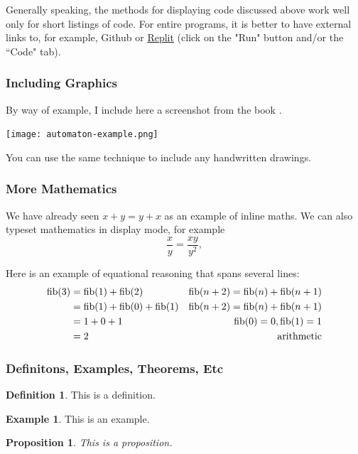 \documentclass{article}
\theoremstyle{theorem}
\newtheorem{proposition}[theorem]{Proposition}
\theoremstyle{definition}
\newtheorem{definition}[theorem]{Definition}
\newtheorem{example}[theorem]{Example}
\theoremstyle{remark}
\begin{document}
\medskip\noindent
Generally speaking,  the methods for displaying code discussed above work well only for short listings of code. For entire programs, it is better to have external links to, for example, Github or \href{https://replit.com/@alexhkurz/automata01#main.hs}{Replit} (click on the "Run" button and/or the ``Code" tab).

\subsubsection{Including Graphics}

By way of example, I include here a screenshot from the book \cite{Hopcroft}.

\texttt{[image: automaton-example.png]}

\noindent
You can use the same technique to include any handwritten drawings.

\subsubsection{More Mathematics}

We have already seen $x+y=y+x$ as an example of inline maths. We can also typeset mathematics in display mode, for example
$$\frac x y =\frac{xy}{y^2},$$

\noindent
Here is an example of equational reasoning that spans several lines:
\begin{align*}
{\rm fib}(3)
& = {\rm fib}(1) +{\rm fib}(2)  & {\rm fib}(n+2) = {\rm fib}(n)  + {\rm fib}(n+1) \\
& = {\rm fib}(1) +{\rm fib}(0)  + {\rm fib}(1) & {\rm fib}(n+2) = {\rm fib}(n)  + {\rm fib}(n+1) \\
& = 1 + 0  +1 & {\rm fib}(0) = 0,   {\rm fib}(1) = 1\\
& = 2 & {\rm arithmetic}
\end{align*}

\subsubsection{Definitons, Examples, Theorems, Etc}

\begin{definition} 
This is a definition.
\end{definition}

\begin{example}
This is an example.
\end{example}

\begin{proposition}
This is a proposition.
\end{proposition}
\end{document}
